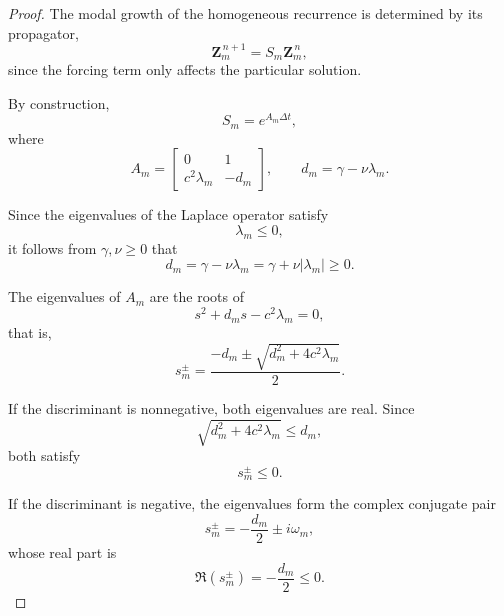 \documentclass{Configuration_Files/PoliMi3i_thesis}
\begin{document}
\begin{proof}
The modal growth of the homogeneous recurrence is determined by its
propagator,
\begin{equation*}
\mathbf Z_m^{\,n+1}
=
S_m
\mathbf Z_m^{\,n},
\end{equation*}
since the forcing term only affects the particular solution.

By construction,
\begin{equation*}
S_m
=
e^{A_m\Delta t},
\end{equation*}
where
\begin{equation*}
A_m
=
\begin{bmatrix}
0 & 1\\
c^2\lambda_m & -d_m
\end{bmatrix},
\qquad
d_m
=
\gamma-\nu\lambda_m.
\end{equation*}

Since the eigenvalues of the Laplace operator satisfy
\begin{equation*}
\lambda_m\le0,
\end{equation*}
it follows from $\gamma,\nu\ge0$ that
\begin{equation*}
d_m
=
\gamma-\nu\lambda_m
=
\gamma+\nu|\lambda_m|
\ge0.
\end{equation*}

The eigenvalues of $A_m$ are the roots of
\begin{equation*}
s^2+d_ms-c^2\lambda_m=0,
\end{equation*}
that is,
\begin{equation*}
s_m^\pm
=
\frac{
-d_m
\pm
\sqrt{d_m^2+4c^2\lambda_m}
}{2}.
\end{equation*}

If the discriminant is nonnegative, both eigenvalues are real. Since
\begin{equation*}
\sqrt{d_m^2+4c^2\lambda_m}
\le d_m,
\end{equation*}
both satisfy
\begin{equation*}
s_m^\pm\le0.
\end{equation*}

If the discriminant is negative, the eigenvalues form the complex conjugate
pair
\begin{equation*}
s_m^\pm
=
-\frac{d_m}{2}
\pm
i\omega_m,
\end{equation*}
whose real part is
\begin{equation*}
\Re(s_m^\pm)
=
-\frac{d_m}{2}
\le0.
\end{equation*}


\end{proof}
\end{document}
